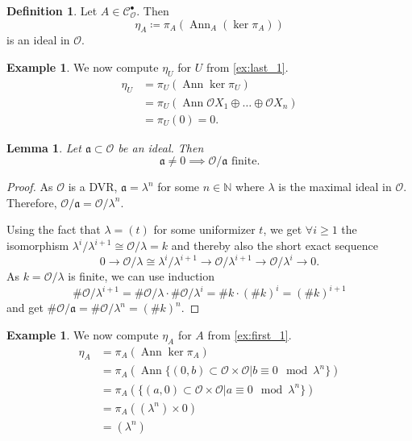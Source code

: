 \documentclass{article}
\theoremstyle{plain}%
\newtheorem{lemma}[theorem]{Lemma}
\theoremstyle{definition}
\newtheorem{definition}[theorem]{Definition}
\newtheorem{example}[theorem]{Example}
\theoremstyle{remark}
\newcommand{\cob}{\mathcal{C}_\mathcal{O}^\bullet}
\newcommand{\ann}{\operatorname{Ann}}
\begin{document}
\begin{definition}
    Let \(A \in \cob\). Then
    \[\eta_A \coloneqq \pi_A(\ann_A (\ker \pi_A))\] is an ideal in \(\mathcal{O}\).
\end{definition}

\begin{example}
    We now compute \(\eta_U\) for \(U\) from \cref{ex:last_1}.
    \begin{align*}
        \eta_U &= \pi_U(\ann \ker \pi_U)\\
        &= \pi_U(\ann \mathcal{O}X_1 \oplus \dots \oplus \mathcal{O}X_n)\\
        &= \pi_U(0) = 0.
    \end{align*}
\end{example}

\begin{lemma}\label{lem:ideals}
    Let \(\mathfrak a \subset \mathcal{O}\) be an ideal. Then
    \[\mathfrak a \neq 0 \implies \mathcal{O}/\mathfrak a \text{ finite}.\]
\end{lemma}
\begin{proof}
    As \(\mathcal{O}\) is a DVR, \(\mathfrak a = \lambda^n\) for some \(n \in \mathbb N\) 
    where \(\lambda\) is the maximal ideal in \(\mathcal{O}\).
    Therefore, \(\mathcal{O}/\mathfrak{a} = \mathcal{O}/\lambda^n.\)

    Using the fact that \(\lambda = (t)\) for some uniformizer \(t\), we get \(\forall i \ge 1\) 
    the isomorphism \(\lambda^i/\lambda^{i+1} \cong \mathcal{O}/\lambda = k\) and thereby also the short exact sequence 
    \[0 \to \mathcal{O}/\lambda \cong \lambda^i/\lambda^{i+1} \to \mathcal{O}/\lambda^{i+1} \to \mathcal{O}/\lambda^{i} \to 0.\]
    As \(k = \mathcal{O}/\lambda\) is finite, we can use induction
    \[\# \mathcal{O}/\lambda^{i+1} = \# \mathcal{O}/\lambda \cdot \# \mathcal{O}/\lambda^i = \# k \cdot (\# k)^i = (\# k)^{i+1}\]
    and get \(\# \mathcal{O}/\mathfrak{a} = \# \mathcal{O}/\lambda^n = (\# k)^n\).
\end{proof}

\begin{example}\label{ex:first_eta}
    We now compute \(\eta_A\) for \(A\) from \cref{ex:first_1}.
    \begin{align*}
        \eta_A &= \pi_A(\ann \ker \pi_A)\\
        &= \pi_A(\ann \{(0, b) \subset \mathcal{O}\times \mathcal{O} | b \equiv 0 \mod \lambda^n\})\\
        &= \pi_A(\{(a, 0) \subset \mathcal{O}\times \mathcal{O} | a \equiv 0 \mod \lambda^n\})\\
        &= \pi_A((\lambda^n) \times 0)\\
        &= (\lambda^n)
    \end{align*}
\end{example}
\end{document}
